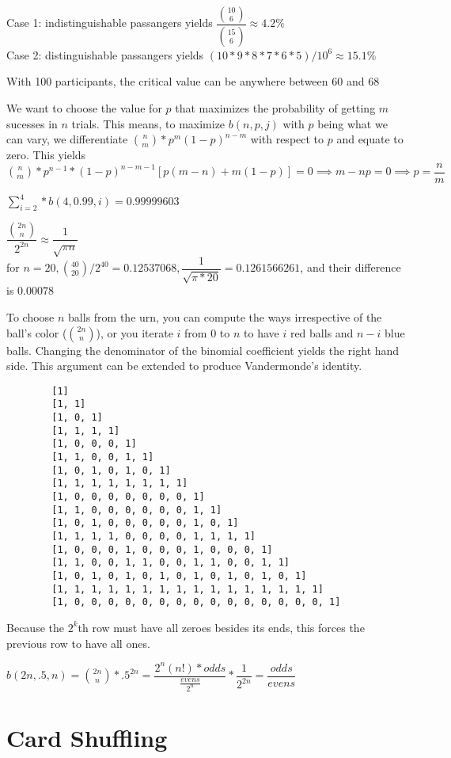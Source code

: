 \begin{oddenumerate}
	\item Case 1: indistinguishable passangers yields $ \dfrac{\binom{10}{6}}{\binom{15}{6}} \approx 4.2 \% $
	\\ Case 2: distinguishable passangers yields $ (10*9*8*7*6*5)/10^6 \approx 15.1 \% $
	\item With 100 participants, the critical value can be anywhere between 60 and 68
	\item We want to choose the value for $ p $ that maximizes the probability of getting $ m $ sucesses in $ n $ trials. This means, to maximize $ b(n,p,j) $ with $ p $ being what we can vary, we differentiate $ \binom{n}{m}*p^{m}(1-p)^{n-m} $ with respect to $ p $ and equate to zero. This yields $ \binom{n}{m} * p^{n-1} * (1-p)^{n-m-1}[p(m-n)+m(1-p)] = 0 \implies m - np = 0 \implies p = \dfrac{n}{m} $
	\item $ \sum_{i=2}^4 * b(4,0.99,i)  = 0.99999603$
	\item $ \dfrac{\binom{2n}{n}}{2^{2n}} \approx \dfrac{1}{\sqrt{\pi n}} $
	\\ for $ n = 20 , \binom{40}{20}/2^{40} = 0.12537068, \dfrac{1}{\sqrt{\pi * 20 }} = 0.1261566261$, and their difference is $ 0.00078 $
	\item To choose $ n $ balls from the urn, you can compute the ways irrespective of the ball's color ($ \binom{2n}{n} $), or you iterate $ i $ from 0 to $ n $ to have $ i $ red balls and $ n - i $ blue balls. Changing the denominator of the binomial coefficient yields the right hand side. This argument can be extended to produce Vandermonde's identity.

	\item 
	
	\begin{verbatim}
		[1]
		[1, 1]
		[1, 0, 1]
		[1, 1, 1, 1]
		[1, 0, 0, 0, 1]
		[1, 1, 0, 0, 1, 1]
		[1, 0, 1, 0, 1, 0, 1]
		[1, 1, 1, 1, 1, 1, 1, 1]
		[1, 0, 0, 0, 0, 0, 0, 0, 1]
		[1, 1, 0, 0, 0, 0, 0, 0, 1, 1]
		[1, 0, 1, 0, 0, 0, 0, 0, 1, 0, 1]
		[1, 1, 1, 1, 0, 0, 0, 0, 1, 1, 1, 1]
		[1, 0, 0, 0, 1, 0, 0, 0, 1, 0, 0, 0, 1]
		[1, 1, 0, 0, 1, 1, 0, 0, 1, 1, 0, 0, 1, 1]
		[1, 0, 1, 0, 1, 0, 1, 0, 1, 0, 1, 0, 1, 0, 1]
		[1, 1, 1, 1, 1, 1, 1, 1, 1, 1, 1, 1, 1, 1, 1, 1]
		[1, 0, 0, 0, 0, 0, 0, 0, 0, 0, 0, 0, 0, 0, 0, 0, 1]
	\end{verbatim}
	Because the $ 2^k $th row must have all zeroes besides its ends, this forces the previous row to have all ones.

	\item $ b(2n, .5,n) = \binom{2n}{n} * .5^{2n}  = \dfrac{2^n (n!) * odds}{\frac{evens}{2^n}} * \dfrac{1}{2^{2n}} = \dfrac{odds}{evens}$

	\end{oddenumerate}

\section{Card Shuffling}

